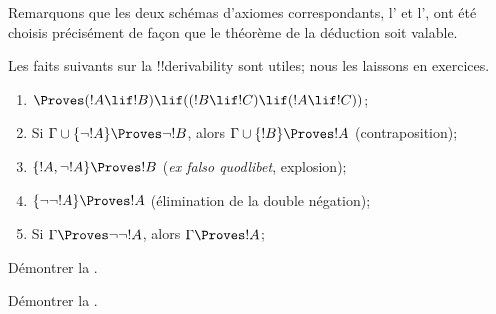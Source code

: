 \documentclass[../../../include/open-logic-section]{subfiles}
\begin{document}
Remarquons que les deux schémas d'axiomes correspondants,
l' et l', ont été choisis
précisément de façon que le théorème de la déduction soit valable.

Les faits suivants sur la !!{derivability} sont utiles; nous les
laissons en exercices.

\begin{prop}
\begin{enumerate}
\item $\Proves (!A \lif !B) \lif ((!B \lif !C)
  \lif (!A \lif !C))$; 
\item Si $\Gamma \cup \{\lnot !A\} \Proves \lnot !B$, alors
  $\Gamma \cup \{!B\} \Proves !A$ (contraposition);
\item $\{!A, \lnot !A\} \Proves !B$ (\emph{ex falso quodlibet},
  explosion); 
\item $\{\lnot\lnot !A\} \Proves !A$ (élimination de la double
  négation); 
\item Si $\Gamma \Proves \lnot\lnot !A$, alors
  $\Gamma \Proves !A$; 
\end{enumerate}
\end{prop}

\begin{prob}
Démontrer la .
\end{prob}
\tagendprob

\begin{prob}
Démontrer la .
\end{prob}
\tagendprob
\end{document}
